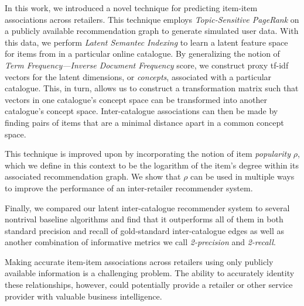 \documentclass[11pt]{article}
\begin{document}
In this work, we introduced a novel technique for predicting item-item
associations across retailers. This technique employs {\em Topic-Sensitive
PageRank} on a publicly available recommendation graph to generate simulated
user data. With this data, we perform {\em Latent Semantec Indexing} to learn a
latent feature space for items from in a particular online catalogue. By
generalizing the notion of {\em Term Frequency---Inverse Document Frequency}
score, we construct proxy tf-idf vectors for the latent dimensions, or {\em
concepts}, associated with a particular catalogue. This, in turn, allows us to
construct a transformation matrix such that vectors in one catalogue's concept
space can be transformed into another catalogue's concept space. Inter-catalogue
associations can then be made by finding pairs of items that are a minimal
distance apart in a common concept space.

This technique is improved upon by incorporating the notion of item {\em
popularity} $\rho$, which we define in this context to be the logarithm of the
item's degree within its associated recommendation graph. We show that $\rho$
can be used in multiple ways to improve the performance of an inter-retailer
recommender system.

Finally, we compared our latent inter-catalogue recommender system to several
nontrival baseline algorithms and find that it outperforms all of them in both
standard precision and recall of gold-standard inter-catalogue edges as well as
another combination of informative metrics we call {\em 2-precision} and {\em
2-recall}.

Making accurate item-item associations across retailers using only publicly
available information is a challenging problem. The ability to accurately
identity these relationships, however, could potentially provide a retailer or
other service provider with valuable business intelligence. 
\end{document}
